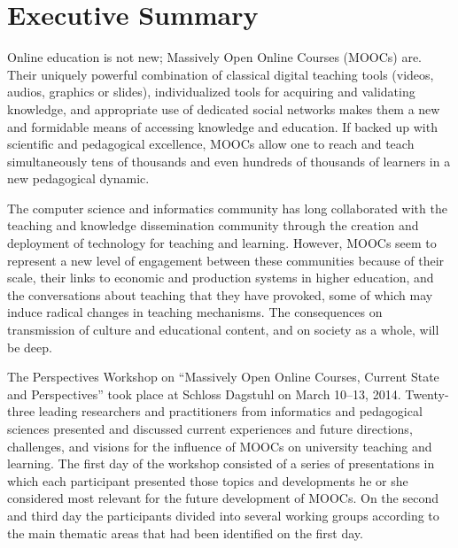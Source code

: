 
\section*{Executive Summary}





Online education is not new; Massively Open Online Courses (MOOCs)
are. Their uniquely powerful combination of classical digital teaching
tools (videos, audios, graphics or slides), individualized tools for
acquiring and validating knowledge, and appropriate use of dedicated
social networks makes them a new and formidable means of accessing
knowledge and education. If backed up with scientific and pedagogical
excellence, MOOCs allow one to reach and teach simultaneously tens of
thousands and even hundreds of thousands of learners in a new
pedagogical dynamic.


The computer science and informatics community has long collaborated
with the teaching and knowledge dissemination community through the
creation and deployment of technology for teaching and learning.
However, MOOCs seem to represent a new level of engagement between these
communities because of their scale, their links to economic and
production systems in higher education, and the conversations about
teaching that they have provoked, some of which may induce radical
changes in teaching mechanisms. The consequences on
transmission of culture and educational content, and on society as a
whole, will be deep.

The Perspectives Workshop on ``Massively Open Online Courses, Current
State and Perspectives'' took place at Schloss Dagstuhl on March 10--13,
2014. 
Twenty-three leading researchers and practitioners from
informatics and pedagogical sciences presented and discussed current
experiences and future directions, challenges, and visions for the
influence of MOOCs on university teaching and learning.
  The first day
of the workshop consisted of a series of presentations in which each
participant presented those topics and developments he or she considered
most relevant for the future development of MOOCs. On the second and
third day the participants divided into several working groups according
to the main thematic areas that had been identified on the first day.


